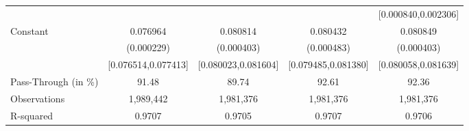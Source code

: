 {\begin{tabular}{l*{4}{c}}
                    &                     &                     &                     &[0.000840,0.002306]         \\
Constant            &    0.076964\sym{***}&    0.080814\sym{***}&    0.080432\sym{***}&    0.080849\sym{***}\\
                    &  (0.000229)         &  (0.000403)         &  (0.000483)         &  (0.000403)         \\
                    &[0.076514,0.077413]         &[0.080023,0.081604]         &[0.079485,0.081380]         &[0.080058,0.081639]         \\
\midrule
Pass-Through (in \%)&       91.48         &       89.74         &       92.61         &       92.36         \\
Observations        &   1,989,442         &   1,981,376         &   1,981,376         &   1,981,376         \\
R-squared           &      0.9707         &      0.9705         &      0.9707         &      0.9706         \\
\bottomrule
\end{tabular}
}
